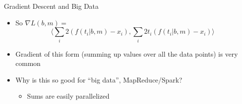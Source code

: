 \documentclass[aspectratio=169]{beamer}
\begin{document}
\begin{frame}{Gradient Descent and Big Data}

\begin{itemize}
\item So $\nabla L(b, m) = $
        $$ \langle \sum_i 2(f(t_i | b, m) - x_i), \sum_i 2t_i(f(t_i | b, m) - x_i) \rangle$$
\item Gradient of this form (summing up values over all the data points) is very common
\item Why is this so good for ``big data'', MapReduce/Spark?
\begin{itemize}
\item Sums are easily parallelized
\end{itemize}
\end{itemize}

\end{frame}
\end{document}
